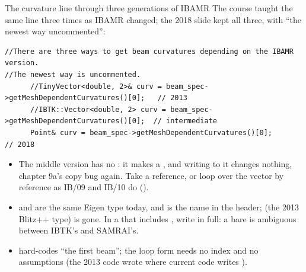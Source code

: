 \documentclass[aspectratio=169,11pt]{beamer}
\begin{document}
\begin{frame}[fragile]{The curvature line through three generations of IBAMR}
\label{fr:api2}
\small The course taught the same line three times as IBAMR changed; the 2018 slide kept all three, with ``the newest way uncommented'':
\begin{lstlisting}[style=cpptiny]
//There are three ways to get beam curvatures depending on the IBAMR version.
//The newest way is uncommented.
      //TinyVector<double, 2>& curv = beam_spec->getMeshDependentCurvatures()[0];   // 2013
      //IBTK::Vector<double, 2> curv = beam_spec->getMeshDependentCurvatures()[0];  // intermediate
      Point& curv = beam_spec->getMeshDependentCurvatures()[0];                     // 2018
\end{lstlisting}
\begin{itemize}\footnotesize
  \item The middle version has no \code{\&}: it makes a , and writing to it changes nothing, chapter 9a's copy bug again. Take a reference, or loop over the vector by reference as IB/09 and IB/10 do ().
  \item {} and  are the same Eigen type today, and  is the name in the header;  (the 2013 Blitz++ type) is gone. In a  that includes , write  in full: a bare  is ambiguous between IBTK's and SAMRAI's.
  \item \code{[0]} hard-codes ``the first beam''; the loop form needs no index and no  assumptions (the 2013 code wrote  where current code writes ).
\end{itemize}
\end{frame}
\end{document}
